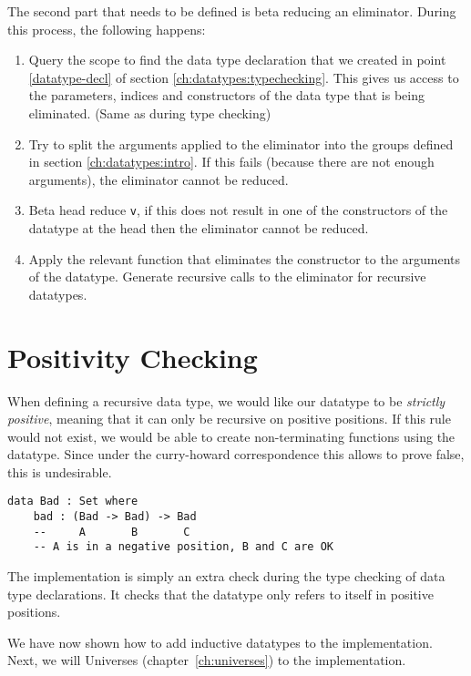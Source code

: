 The second part that needs to be defined is beta reducing an eliminator. During this process, the following happens:
\begin{enumerate}
	\item Query the scope to find the data type declaration that we created in point \ref{datatype-decl} of section \ref{ch:datatypes:typechecking}. This gives us access to the parameters, indices and constructors of the data type that is being eliminated. (Same as during type checking)
	\item Try to split the arguments applied to the eliminator into the groups defined in section \ref{ch:datatypes:intro}. If this fails (because there are not enough arguments), the eliminator cannot be reduced.
	\item Beta head reduce \verb|v|, if this does not result in one of the constructors of the datatype at the head then the eliminator cannot be reduced. 
	\item Apply the relevant function that eliminates the constructor to the arguments of the datatype. Generate recursive calls to the eliminator for recursive datatypes.
\end{enumerate}

\section{Positivity Checking}
\label{ch:datatypes:positivity}
	
When defining a recursive data type, we would like our datatype to be \emph{strictly positive}, meaning that it can only be recursive on positive positions. If this rule would not exist, we would be able to create non-terminating functions using the datatype. Since under the curry-howard correspondence this allows to prove false, this is undesirable.

\begin{lstlisting}
data Bad : Set where
	bad : (Bad -> Bad) -> Bad
	--     A       B       C
	-- A is in a negative position, B and C are OK
\end{lstlisting}

The implementation is simply an extra check during the type checking of data type declarations. It checks that the datatype only refers to itself in positive positions.

We have now shown how to add inductive datatypes to the implementation. Next, we will Universes (chapter~\ref{ch:universes}) to the implementation.

